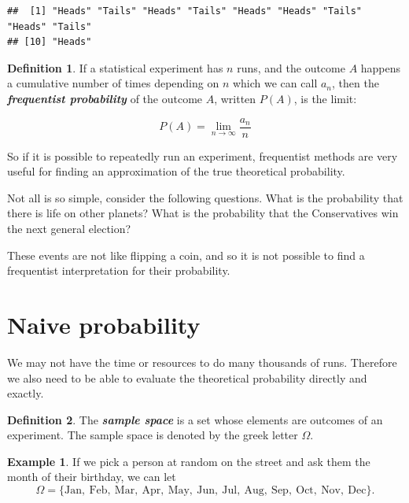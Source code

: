 \documentclass[
]{book}
\theoremstyle{definition}
\newtheorem{definition}{Definition}[chapter]
\theoremstyle{definition}
\newtheorem{example}{Example}[chapter]
\theoremstyle{definition}
\theoremstyle{definition}
\theoremstyle{remark}
\begin{document}
\begin{verbatim}
##  [1] "Heads" "Tails" "Heads" "Tails" "Heads" "Heads" "Tails" "Heads" "Tails"
## [10] "Heads"
\end{verbatim}

\begin{definition}
\protect\hypertarget{def:freq}{}\label{def:freq}If a statistical experiment has \(n\) runs, and the outcome \(A\) happens a cumulative number of times depending on \(n\) which we can call \(a_n\), then the \textbf{\emph{frequentist probability}} of the outcome \(A\), written \(P(A)\), is the limit:

\[P(A) = \lim_{n\to \infty} \frac{a_n}{n}\]
\end{definition}

So if it is possible to repeatedly run an experiment, frequentist methods are very useful for finding an approximation of the true theoretical probability.

Not all is so simple, consider the following questions. What is the probability that there is life on other planets? What is the probability that the Conservatives win the next general election?

These events are not like flipping a coin, and so it is not possible to find a frequentist interpretation for their probability.

\hypertarget{naive-probability}{%
\section{Naive probability}\label{naive-probability}}

We may not have the time or resources to do many thousands of runs. Therefore we also need to be able to evaluate the theoretical probability directly and exactly.

\begin{definition}
\protect\hypertarget{def:samplespace}{}\label{def:samplespace}The \textbf{\emph{sample space}} is a set whose elements are outcomes of an experiment. The sample space is denoted by the greek letter \(\Omega\).
\end{definition}

\begin{example}
\protect\hypertarget{exm:monthspace}{}\label{exm:monthspace}If we pick a person at random on the street and ask them the month of their birthday,
we can let
\[\Omega = \{\text{Jan}, \ \text{Feb}, \ \text{Mar},  \ \text{Apr}, \ \text{May}, \ \text{Jun}, \ \text{Jul}, \ \text{Aug}, \ \text{Sep}, \ \text{Oct}, \ \text{Nov}, \ \text{Dec} \}.\]
\end{example}
\end{document}
